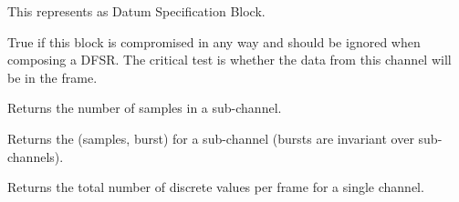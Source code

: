 \documentclass[letterpaper,10pt,english]{sphinxmanual}
\begin{document}
\begin{fulllineitems}
\label{\detokenize{ref/LIS/core/LogiRec:TotalDepth.LIS.core.LogiRec.DatumSpecBlock}}
This represents as Datum Specification Block.

\begin{fulllineitems}
\label{\detokenize{ref/LIS/core/LogiRec:TotalDepth.LIS.core.LogiRec.DatumSpecBlock.isNull}}
True if this block is compromised in any way and should be ignored
when composing a DFSR. The critical test is whether the data from this
channel will be in the frame.

\end{fulllineitems}


\begin{fulllineitems}
\label{\detokenize{ref/LIS/core/LogiRec:TotalDepth.LIS.core.LogiRec.DatumSpecBlock.samples}}
Returns the number of samples in a sub-channel.

\end{fulllineitems}


\begin{fulllineitems}
\label{\detokenize{ref/LIS/core/LogiRec:TotalDepth.LIS.core.LogiRec.DatumSpecBlock.bursts}}
Returns the (samples, burst) for a sub-channel (bursts are invariant over sub-channels).

\end{fulllineitems}


\begin{fulllineitems}
\label{\detokenize{ref/LIS/core/LogiRec:TotalDepth.LIS.core.LogiRec.DatumSpecBlock.values}}
Returns the total number of discrete values per frame for a single channel.

\end{fulllineitems}



\end{fulllineitems}
\end{document}

